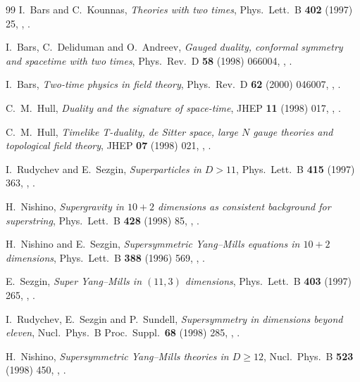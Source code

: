 \begin{thebibliography}{99}
I.~Bars and C.~Kounnas, \textit{Theories with two times}, Phys.\ Lett.\ B \textbf{402} (1997) 25, , .

I.~Bars, C.~Deliduman and O.~Andreev, \textit{Gauged duality, conformal symmetry and spacetime with two times}, Phys.\ Rev.\ D \textbf{58} (1998) 066004, , .

I.~Bars, \textit{Two-time physics in field theory}, Phys.\ Rev.\ D \textbf{62} (2000) 046007, , .

C.~M.~Hull, \textit{Duality and the signature of space-time}, JHEP \textbf{11} (1998) 017, , .

C.~M.~Hull, \textit{Timelike T-duality, de Sitter space, large $N$ gauge theories and topological field theory}, JHEP \textbf{07} (1998) 021, , .

I.~Rudychev and E.~Sezgin, \textit{Superparticles in $D>11$}, Phys.\ Lett.\ B \textbf{415} (1997) 363, , .

H.~Nishino, \textit{Supergravity in $10+2$ dimensions as consistent background for superstring}, Phys.\ Lett.\ B \textbf{428} (1998) 85, , .

H.~Nishino and E.~Sezgin, \textit{Supersymmetric Yang--Mills equations in $10+2$ dimensions}, Phys.\ Lett.\ B \textbf{388} (1996) 569, , .

E.~Sezgin, \textit{Super Yang--Mills in $(11,3)$ dimensions}, Phys.\ Lett.\ B \textbf{403} (1997) 265, , .

I.~Rudychev, E.~Sezgin and P.~Sundell, \textit{Supersymmetry in dimensions beyond eleven}, Nucl.\ Phys.\ B Proc.\ Suppl.\ \textbf{68} (1998) 285, , .

H.~Nishino, \textit{Supersymmetric Yang--Mills theories in $D\ge12$}, Nucl.\ Phys.\ B \textbf{523} (1998) 450, , .


\end{thebibliography}
